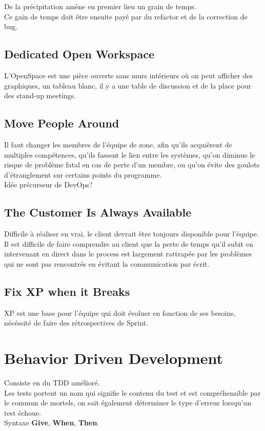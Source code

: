\documentclass{report}
\begin{document}
		De la précipitation amène en premier lieu un grain de temps.\\

		Ce gain de temps doit être ensuite payé par du refactor et de la correction de bug.\\

	\section{Dedicated Open Workspace}

		L'OpenSpace est une pièce ouverte sans murs intérieurs où on peut afficher des graphiques, un tableau blanc, il y a une table de discussion et de la place pour des stand-up meetings.\\

	\section{Move People Around}

		Il faut changer les membres de l'équipe de zone, afin qu'ils acquièrent de multiples compétences, qu'ils fassent le lien entre les systèmes, qu'on diminue le risque de problème fatal en cas de perte d'un membre, ou qu'on évite des goulots d'étranglement sur certains points du programme.\\

		Idée précurseur de DevOps?\\

	\section{The Customer Is Always Available}

		Difficile à réaliser en vrai, le client devrait être toujours disponible pour l'équipe.\\

		Il est difficile de faire comprendre au client que la perte de temps qu'il subit en intervenant en direct dans le process est largement rattrapée par les problèmes qui ne sont pas rencontrés en évitant la communication par écrit.\\

	\section{Fix XP when it Breaks}

		XP est une base pour l'équipe qui doit évoluer en fonction de ses besoins, nécéssité de faire des rétrospectives de Sprint.\\


\chapter{Behavior Driven Development}

	Consiste en du TDD amélioré.\\

	Les tests portent un nom qui signifie le contenu du test et est compréhensible par le commun de mortels, on sait également déterminer le type d'erreur lorsqu'un test échoue.\\

	Syntaxe \textbf{Give}, \textbf{When}, \textbf{Then}.
\end{document}
